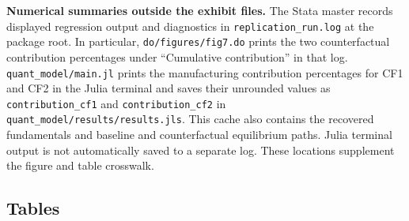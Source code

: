 \documentclass[11pt]{article}
\newcommand{\pkgfile}[1]{\nolinkurl{#1}}
\begin{document}
\noindent\textbf{Numerical summaries outside the exhibit files.}
The Stata master records displayed regression output and diagnostics in
\pkgfile{replication_run.log} at the package root. In particular,
\pkgfile{do/figures/fig7.do} prints the two counterfactual contribution
percentages under ``Cumulative contribution'' in that log.
\pkgfile{quant_model/main.jl} prints the manufacturing contribution
percentages for CF1 and CF2 in the Julia terminal and saves their
unrounded values as \texttt{contribution\_cf1} and
\texttt{contribution\_cf2} in
\pkgfile{quant_model/results/results.jls}. This cache also contains
the recovered fundamentals and baseline and counterfactual equilibrium
paths. Julia terminal output is not automatically saved to a separate log.
These locations supplement the figure and table crosswalk.

\subsection*{Tables}
\end{document}
